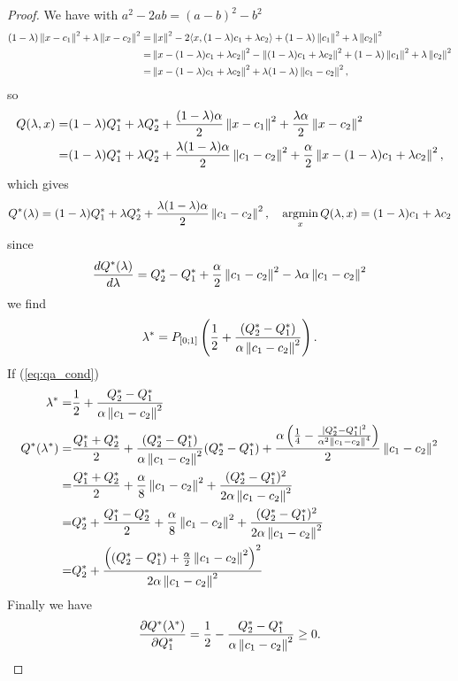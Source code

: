 \documentclass[12pt,english]{article}
\begin{document}
\begin{proof}
We have with $a^2-2ab = (a-b)^2 -b^2$
%
\begin{align*}
(1-\lambda)\left\|x-c_1\right\|^2 + \lambda\left\|x-c_2\right\|^2 
=&\left\|x\right\|^2 - 2\langle x,(1-\lambda)c_1+\lambda c_2\rangle+(1-\lambda)\left\|c_1\right\|^2 + \lambda\left\|c_2\right\|^2 \\
=& \left\|x - (1-\lambda)c_1+\lambda c_2\right\|^2 - \left\|(1-\lambda)c_1+\lambda c_2\right\|^2 +(1-\lambda)\left\|c_1\right\|^2 + \lambda\left\|c_2\right\|^2\\
=& \left\|x - (1-\lambda)c_1+\lambda c_2\right\|^2 +\lambda(1-\lambda)\left\|c_1-c_2\right\|^2,
\end{align*}
%
so
%
\begin{align*}
Q(\lambda, x) =& (1-\lambda)Q_1^*+\lambda Q_2^* + \frac{(1-\lambda)\alpha}{2}\left\|x-c_1\right\|^2 + \frac{\lambda\alpha}{2}\left\|x-c_2\right\|^2 \\
=& (1-\lambda)Q_1^*+\lambda Q_2^* + \frac{\lambda(1-\lambda)\alpha}{2}\left\|c_1-c_2\right\|^2
+\frac{\alpha}{2}\left\|x - (1-\lambda)c_1+\lambda c_2\right\|^2,
\end{align*}
%
which gives
%
\begin{align*}
Q^*(\lambda) = (1-\lambda)Q_1^*+\lambda Q_2^* + \frac{\lambda(1-\lambda)\alpha}{2}\left\|c_1-c_2\right\|^2,\quad \operatorname*{argmin}_{x} Q(\lambda,x)=(1-\lambda)c_1+\lambda c_2
\end{align*}
%
since 
%
\begin{align*}
\frac{d Q^*(\lambda)}{d\lambda} = Q_2^*-Q_1^* + \frac{\alpha}{2}\left\|c_1-c_2\right\|^2 -\lambda\alpha\left\|c_1-c_2\right\|^2
\end{align*}
%
we find
%
\begin{align*}
\lambda^* = P_{[0;1]}\left(\frac12 + \frac{(Q_2^*-Q_1^*)}{\alpha\left\|c_1-c_2\right\|^2}\right).
\end{align*}
%
If (\ref{eq:qa_cond})
%
\begin{align*}
\lambda^*=&\frac12 + \frac{Q_2^*-Q_1^*}{\alpha\left\|c_1-c_2\right\|^2}\\
Q^*(\lambda^*) =& \frac{Q_1^*+Q_2^*}{2}+\frac{(Q_2^*-Q_1^*)}{\alpha\left\|c_1-c_2\right\|^2}(Q_2^*-Q_1^*) + \frac{\alpha\left(\frac14-\frac{\left\vert{Q_2^*-Q_1^*}\right\vert^2}{\alpha^2\left\|c_1-c_2\right\|^4}\right)}{2}\left\|c_1-c_2\right\|^2\\
=& \frac{Q_1^*+Q_2^*}{2}+ \frac{\alpha}{8}\left\|c_1-c_2\right\|^2+\frac{(Q_2^*-Q_1^*)^2}{2\alpha\left\|c_1-c_2\right\|^2}\\
=& Q_2^* + \frac{Q_1^*-Q_2^*}{2} + \frac{\alpha}{8}\left\|c_1-c_2\right\|^2+\frac{(Q_2^*-Q_1^*)^2}{2\alpha\left\|c_1-c_2\right\|^2}\\
=& Q_2^* +\frac{\left( (Q_2^*-Q_1^*)+\frac{\alpha}{2}\left\|c_1-c_2\right\|^2\right)^2}{2\alpha\left\|c_1-c_2\right\|^2}
\end{align*}
%
Finally we have
%
\begin{align*}
\frac{\partial Q^*(\lambda^*)}{\partial Q_1^*} = \frac12 -\frac{Q_2^*-Q_1^*}{\alpha\left\|c_1-c_2\right\|^2}\ge0.
\end{align*}
%
\end{proof}
\end{document}
